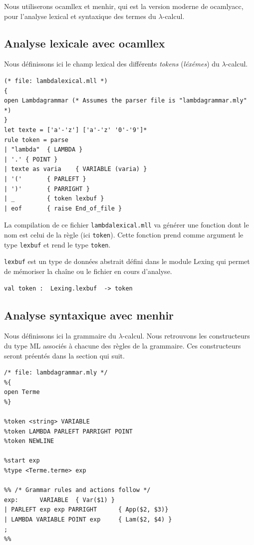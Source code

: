 Nous utiliserons ocamllex et menhir, qui est la version moderne de ocamlyacc, pour l'analyse lexical et syntaxique des termes
du $\lambda $-calcul.

\subsection{Analyse lexicale avec ocamllex}
Nous définissons ici le champ lexical des différents \textit{tokens}  (\textit{léxémes}) du
$\lambda$-calcul.

\begin{Verbatim}
(* file: lambdalexical.mll *)
{
open Lambdagrammar (* Assumes the parser file is "lambdagrammar.mly" *)
}
let texte = ['a'-'z'] ['a'-'z' '0'-'9']*
rule token = parse
| "lambda"	{ LAMBDA }
| '.' { POINT }
| texte as varia	{ VARIABLE (varia) }
| '('		{ PARLEFT }
| ')'		{ PARRIGHT }
| _			{ token lexbuf }
| eof		{ raise End_of_file }
\end{Verbatim}

La compilation de ce fichier \texttt{lambdalexical.mll} va générer une fonction dont le nom
est celui de la règle (ici \texttt{token}).
Cette fonction prend comme argument le type \texttt{lexbuf} et rend le type \texttt{token}. 

\texttt{lexbuf}  est un type de données abstrait défini dans le module Lexing 
qui permet de mémoriser la chaîne ou le fichier en cours d'analyse.
\begin{Verbatim}
val token :  Lexing.lexbuf  -> token 
\end{Verbatim}

\subsection{Analyse syntaxique avec menhir}
Nous définissons ici la grammaire du $\lambda$-calcul.
Nous retrouvons les constructeurs du type ML associés à chacune des règles de la grammaire.
Ces constructeurs seront préentés dans la section qui suit.


\begin{Verbatim}
/* file: lambdagrammar.mly */
%{
open Terme
%}

%token <string> VARIABLE
%token LAMBDA PARLEFT PARRIGHT POINT
%token NEWLINE

%start exp
%type <Terme.terme> exp

%% /* Grammar rules and actions follow */
exp:      VARIABLE	{ Var($1) }
| PARLEFT exp exp PARRIGHT		{ App($2, $3)}
| LAMBDA VARIABLE POINT exp		{ Lam($2, $4) }
;
%%
\end{Verbatim}



